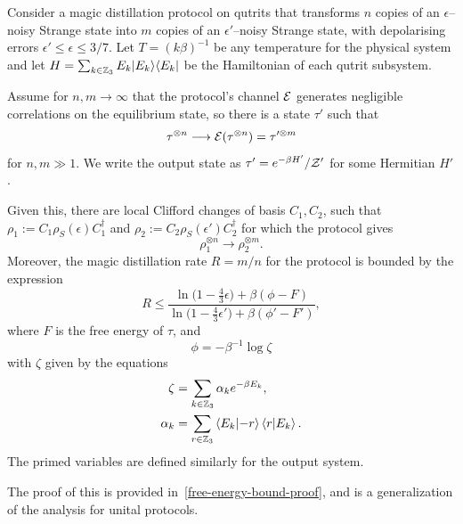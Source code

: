 \documentclass[pra,
aps,
twocolumn,
superscriptaddress,
groupedaddress,
nofootinbib,
reprint
]{revtex4-1}
\begin{document}
\begin{theorem}\label{thm:free-energy}
	Consider a magic distillation protocol on qutrits that transforms $n$ copies of an $\epsilon$--noisy Strange state into $m$ copies of an $\epsilon'$--noisy Strange state, with depolarising errors $\epsilon' \leq \epsilon \leq 3/7$. Let $T =(k\beta)^{-1}$ be any temperature for the physical system and let $H= \sum_{k \in \mathbb{Z}_3} E_k |E_k\rangle\langle E_k|$ be the Hamiltonian of each qutrit subsystem.

Assume for $n,m \rightarrow \infty$ that the protocol's channel ${\mathcal E}$ generates negligible correlations on the equilibrium state, so there is a state $\tau'$ such that
\begin{equation}
	\tau^{\otimes n} \longrightarrow {\mathcal E}(\tau^{\otimes n}) = \tau^{\prime \otimes m}
\end{equation} 
for $n,m \gg 1$. 
We write the output state as $\tau' = e^{-\beta H'}/\mathcal{Z}'$ for some Hermitian $H'$.

Given this, there are local Clifford changes of basis $C_1,C_2$, such that $\rho_1 := C_1 \rho_S(\epsilon) C_1^\dagger$ and $\rho_2 := C_2 \rho_S(\epsilon') C_2^\dagger$ for which the protocol gives
\begin{equation}
\rho_1^{\otimes n} \longrightarrow \rho_2^{ \otimes m}.
\end{equation}
Moreover, the magic distillation rate $R = m/n$ for the protocol is bounded by the expression
\begin{equation}\label{eq:rate_bounds_proof}
	R \leq \dfrac{\ln{\big( 1-\frac{4}{3}\epsilon \big)} + \beta (\phi - F)}{\ln{\big( 1-\frac{4}{3}\epsilon' \big)} + \beta (\phi' - F')},
\end{equation}
where $F$ is the free energy of $\tau$,  and 
\begin{equation}
\phi = -\beta^{-1} \log \zeta
\end{equation}
with $\zeta$ given by the equations
\begin{align}
	\zeta &= \sum_{k\in \mathbb{Z}_3} \alpha_k e^{-\beta E_k}, \nonumber\\
\alpha_k &= \sum_{r \in \mathbb{Z}_3} \braket{E_k}{-r}\braket{r}{E_k}.
\end{align}
The primed variables are defined similarly for the output system.
\end{theorem}
The proof of this is provided in~\cref{free-energy-bound-proof}, and is a generalization of the analysis for unital protocols.
\end{document}
